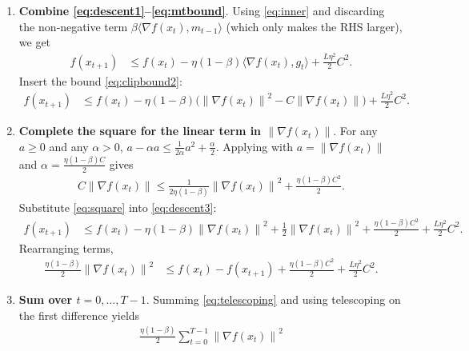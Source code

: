 \documentclass{article}
\newcommand{\norm}[1]{\left\lVert #1 \right\rVert}
\begin{document}
\begin{enumerate}
\begin{align}
        \label{eq:mtbound}
    \end{align}
    \item[Step 5.] \textbf{Combine \eqref{eq:descent1}–\eqref{eq:mtbound}}.  
    Using \eqref{eq:inner} and discarding the non‑negative term $\beta\langle\nabla f(x_t),m_{t-1}\rangle$ (which only makes the RHS larger), we get
    \begin{align}
        f(x_{t+1})
        &\le f(x_t) - \eta(1-\beta)\langle\nabla f(x_t),g_t\rangle
            + \frac{L\eta^2}{2}C^2 .
        \label{eq:descent2}
    \end{align}
    Insert the bound \eqref{eq:clipbound2}:
    \begin{align}
        f(x_{t+1})
        &\le f(x_t) - \eta(1-\beta)\bigl(\norm{\nabla f(x_t)}^2 - C\norm{\nabla f(x_t)}\bigr)
            + \frac{L\eta^2}{2}C^2 .
        \label{eq:descent3}
    \end{align}
    \item[Step 6.] \textbf{Complete the square for the linear term in $\norm{\nabla f(x_t)}$}.  
    For any $a\ge0$ and any $\alpha>0$,
    $a - \alpha a \le \frac{1}{2\alpha}a^2 + \frac{\alpha}{2}$.
    Applying with $a=\norm{\nabla f(x_t)}$ and $\alpha = \frac{\eta(1-\beta)C}{2}$ gives
    \begin{align}
        C\norm{\nabla f(x_t)}
        \le \frac{1}{2\eta(1-\beta)}\norm{\nabla f(x_t)}^2
           + \frac{\eta(1-\beta)C^2}{2} .
        \label{eq:square}
    \end{align}
    Substitute \eqref{eq:square} into \eqref{eq:descent3}:
    \begin{align}
        f(x_{t+1})
        &\le f(x_t) - \eta(1-\beta)\norm{\nabla f(x_t)}^2
            + \frac{1}{2}\norm{\nabla f(x_t)}^2
            + \frac{\eta(1-\beta)C^2}{2}
            + \frac{L\eta^2}{2}C^2 .
        \label{eq:descent4}
    \end{align}
    Rearranging terms,
    \begin{align}
        \frac{\eta(1-\beta)}{2}\norm{\nabla f(x_t)}^2
        &\le f(x_t)-f(x_{t+1}) 
            + \frac{\eta(1-\beta)C^2}{2}
            + \frac{L\eta^2}{2}C^2 .
        \label{eq:telescoping}
    \end{align}
    \item[Step 7.] \textbf{Sum over $t=0,\dots,T-1$}.  
    Summing \eqref{eq:telescoping} and using telescoping on the first difference yields
    \begin{align}
        \frac{\eta(1-\beta)}{2}\sum_{t=0}^{T-1}\norm{\nabla f(x_t)}^2

\end{align}
\end{enumerate}
\end{document}
